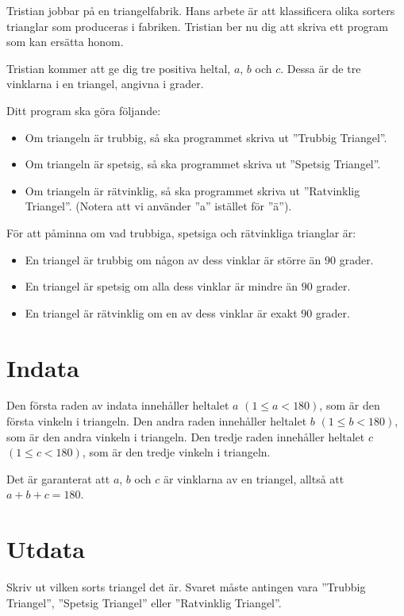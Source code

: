 \noindent

Tristian jobbar på en triangelfabrik.
Hans arbete är att klassificera olika sorters trianglar som produceras i fabriken.
Tristian ber nu dig att skriva ett program som kan ersätta honom.

Tristian kommer att ge dig tre positiva heltal, $a$, $b$ och $c$. 
Dessa är de tre vinklarna i en triangel, angivna i grader.

Ditt program ska göra följande:
\begin{itemize}
  \item Om triangeln är trubbig, så ska programmet skriva ut ''Trubbig Triangel''.
  \item Om triangeln är spetsig, så ska programmet skriva ut ''Spetsig Triangel''.
  \item Om triangeln är rätvinklig, så ska programmet skriva ut ''Ratvinklig Triangel''.
  (Notera att vi använder ''a'' istället för ''ä'').
\end{itemize}

För att påminna om vad trubbiga, spetsiga och rätvinkliga trianglar är:
\begin{itemize}
  \item En triangel är trubbig om någon av dess vinklar är större än $90$ grader.
  \item En triangel är spetsig om alla dess vinklar är mindre än $90$ grader.
  \item En triangel är rätvinklig om en av dess vinklar är exakt $90$ grader.
\end{itemize}


\section*{Indata}
Den första raden av indata innehåller heltalet $a$ $(1 \leq a < 180)$, som är den första vinkeln i triangeln.
Den andra raden innehåller heltalet $b$ $(1 \leq b < 180)$, som är den andra vinkeln i triangeln.
Den tredje raden innehåller heltalet $c$ $(1 \leq c < 180)$, som är den tredje vinkeln i triangeln.

Det är garanterat att $a$, $b$ och $c$ är vinklarna av en triangel, alltså att $a + b + c = 180$.

\section*{Utdata}
Skriv ut vilken sorts triangel det är. Svaret måste antingen vara ''Trubbig Triangel'',
''Spetsig Triangel'' eller ''Ratvinklig Triangel''.

